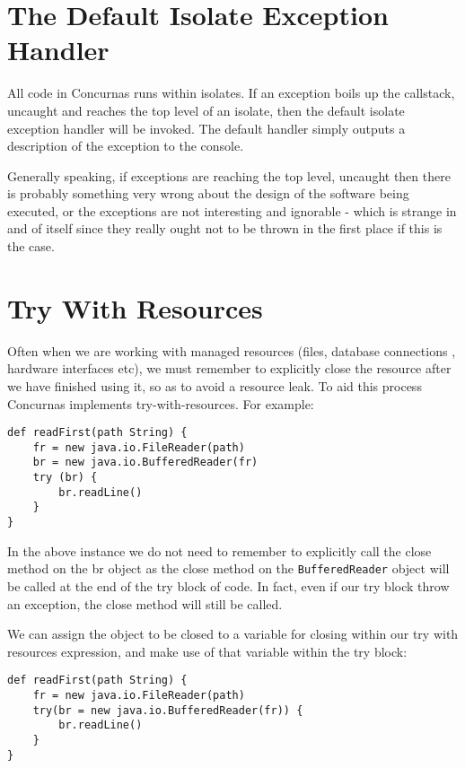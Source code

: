 \documentclass[conc-doc]{subfiles}
\begin{document}
\section{The Default Isolate Exception Handler}
All code in Concurnas runs within isolates. If an exception boils up the callstack, uncaught and reaches the top level of an isolate, then the default isolate exception handler will be invoked. The default handler simply outputs a description of the exception to the console.






Generally speaking, if exceptions are reaching the top level, uncaught then there is probably something very wrong about the design of the software being executed, or the exceptions are not interesting and ignorable - which is strange in and of itself since they really ought not to be thrown in the first place if this is the case.

\section{Try With Resources}
Often when we are working with managed resources (files, database connections , hardware interfaces etc), we must remember to explicitly close the resource after we have finished using it, so as to avoid a resource leak. To aid this process Concurnas implements try-with-resources. For example:
\begin{lstlisting}
def readFirst(path String) {
	fr = new java.io.FileReader(path)
	br = new java.io.BufferedReader(fr)
	try (br) {
		br.readLine()
	}
}
\end{lstlisting}

In the above instance we do not need to remember to explicitly call the close method on the br object as the close method on the \lstinline{BufferedReader} object will be called at the end of the try block of code. In fact, even if our try block throw an exception, the close method will still be called.

We can assign the object to be closed to a variable for closing within our try with resources expression, and make use of that variable within the try block:
\begin{lstlisting}
def readFirst(path String) {
	fr = new java.io.FileReader(path)
	try(br = new java.io.BufferedReader(fr)) {
		br.readLine()
	}
}
\end{lstlisting}
\end{document}
